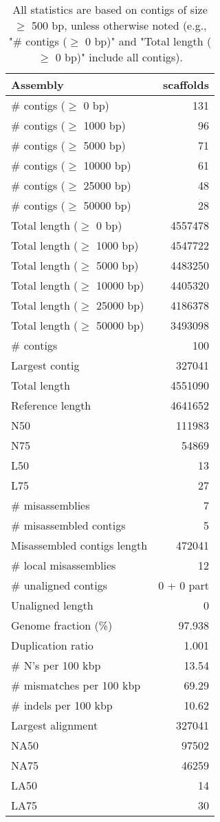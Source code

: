 \documentclass[12pt,a4paper]{article}
\begin{document}
\begin{table}[ht]
\begin{center}
\caption{All statistics are based on contigs of size $\geq$ 500 bp, unless otherwise noted (e.g., "\# contigs ($\geq$ 0 bp)" and "Total length ($\geq$ 0 bp)" include all contigs).}
\begin{tabular}{|l*{1}{|r}|}
\hline
Assembly & scaffolds \\ \hline
\# contigs ($\geq$ 0 bp) & 131 \\ \hline
\# contigs ($\geq$ 1000 bp) & 96 \\ \hline
\# contigs ($\geq$ 5000 bp) & 71 \\ \hline
\# contigs ($\geq$ 10000 bp) & 61 \\ \hline
\# contigs ($\geq$ 25000 bp) & 48 \\ \hline
\# contigs ($\geq$ 50000 bp) & 28 \\ \hline
Total length ($\geq$ 0 bp) & 4557478 \\ \hline
Total length ($\geq$ 1000 bp) & 4547722 \\ \hline
Total length ($\geq$ 5000 bp) & 4483250 \\ \hline
Total length ($\geq$ 10000 bp) & 4405320 \\ \hline
Total length ($\geq$ 25000 bp) & 4186378 \\ \hline
Total length ($\geq$ 50000 bp) & 3493098 \\ \hline
\# contigs & 100 \\ \hline
Largest contig & 327041 \\ \hline
Total length & 4551090 \\ \hline
Reference length & 4641652 \\ \hline
N50 & 111983 \\ \hline
N75 & 54869 \\ \hline
L50 & 13 \\ \hline
L75 & 27 \\ \hline
\# misassemblies & 7 \\ \hline
\# misassembled contigs & 5 \\ \hline
Misassembled contigs length & 472041 \\ \hline
\# local misassemblies & 12 \\ \hline
\# unaligned contigs & 0 + 0 part \\ \hline
Unaligned length & 0 \\ \hline
Genome fraction (\%) & 97.938 \\ \hline
Duplication ratio & 1.001 \\ \hline
\# N's per 100 kbp & 13.54 \\ \hline
\# mismatches per 100 kbp & 69.29 \\ \hline
\# indels per 100 kbp & 10.62 \\ \hline
Largest alignment & 327041 \\ \hline
NA50 & 97502 \\ \hline
NA75 & 46259 \\ \hline
LA50 & 14 \\ \hline
LA75 & 30 \\ \hline
\end{tabular}
\end{center}
\end{table}
\end{document}
